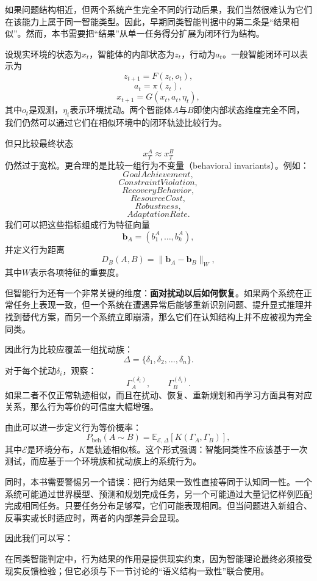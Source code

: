 如果问题结构相近，但两个系统产生完全不同的行动后果，我们当然很难认为它们在该能力上属于同一智能类型。因此，早期同类智能判据中的第二条是``结果相似''。然而，本书需要把``结果''从单一任务得分扩展为闭环行为结构。

设现实环境的状态为$x_t$，智能体的内部状态为$z_t$，行动为$a_t$。一般智能闭环可以表示为
\[
z_{t+1}
=
F(z_t,o_t),
\]
\[
a_t
=
\pi(z_t),
\]
\[
x_{t+1}
=
G(x_t,a_t,\eta_t),
\]
其中$o_t$是观测，$\eta_t$表示环境扰动。两个智能体$A$与$B$即使内部状态维度完全不同，我们仍然可以通过它们在相似环境中的闭环轨迹比较行为。

但只比较最终状态
\[
x_T^A\approx x_T^B
\]
仍然过于宽松。更合理的是比较一组行为不变量（behavioral invariants）。例如：
\[
GoalAchievement,
\]
\[
ConstraintViolation,
\]
\[
RecoveryBehavior,
\]
\[
ResourceCost,
\]
\[
Robustness,
\]
\[
AdaptationRate.
\]
我们可以把这些指标组成行为特征向量
\[
\mathbf b_A
=
(b_1^A,\dots,b_k^A),
\]
并定义行为距离
\[
D_B(A,B)
=
\|\mathbf b_A-\mathbf b_B\|_W,
\]
其中$W$表示各项特征的重要度。

但智能行为还有一个非常关键的维度：\textbf{面对扰动以后如何恢复}。如果两个系统在正常任务上表现一致，但一个系统在遭遇异常后能够重新识别问题、提升显式推理并找到替代方案，而另一个系统立即崩溃，那么它们在认知结构上并不应被视为完全同类。

因此行为比较应覆盖一组扰动族：
\[
\Delta=
\{\delta_1,\delta_2,\dots,\delta_n\}.
\]
对于每个扰动$\delta_i$，观察：
\[
\Gamma_A^{(\delta_i)},
\qquad
\Gamma_B^{(\delta_i)}.
\]
如果二者不仅正常轨迹相似，而且在扰动、恢复、重新规划和再学习方面具有对应关系，那么行为等价的可信度大幅增强。

由此可以进一步定义行为等价概率：
\[
P_{\mathrm{beh}}(A\sim B)
=
\mathbb E_{\mathcal E,\Delta}
\left[
K(
\Gamma_A,
\Gamma_B
)
\right],
\]
其中$\mathcal E$是环境分布，$K$是轨迹相似核。这个形式强调：智能同类性不应该基于一次测试，而应基于一个环境族和扰动族上的系统行为。

同时，本书需要警惕另一个错误：把行为结果一致性直接等同于认知同一性。一个系统可能通过世界模型、预测和规划完成任务，另一个可能通过大量记忆样例匹配完成相同任务。只要任务分布足够窄，它们可能表现相同。但当问题进入新组合、反事实或长时适应时，两者的内部差异会显现。

因此我们可以写：
\begin{statementbox}
\centering
{}
\end{statementbox}
在同类智能判定中，行为结果的作用是提供现实约束，因为智能理论最终必须接受现实反馈检验；但它必须与下一节讨论的``语义结构一致性''联合使用。

